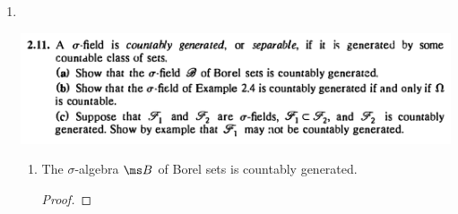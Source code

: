 \begin{enumerate}
\begin{enumerate}[label=(\alph*)]
    \begin{proof}
      Let $\ms A = \{A_1, A_2, \ldots\}$and let $X \in f(\ms A)$.

      Then $X$ can be constructed by starting with the elements $\{A_1, A^c_1, A_2, A^c_2, \ldots\}$ and
      recursively applying finitely many union operations and finitely many intersection operations.

      Suppose that $X$ can be constructed using $m$ union operations.


      We proceed by induction. Since $f(\ms A)$ is an algebra, but not in general a $\sigma$-algebra, it can be
      built by starting with some basis elements and recursively applying a finite number of union and
      intersection operations.




      Induction?

      The finite numbers $m$ and $n_i$ must correspond to the finite unions ($m$) and intersections ($n_i$)
      that are permitted when constructing a finitely additive algebra.


      Or direct? Direct:



      Then it is possible to construct $X$ from the elements of $\ms A$, using complementation, finite unions
      and finite intersections.
    \end{proof}


  \end{enumerate}
\newpage
\item~\\
  \begin{mdframed}
    \includegraphics[width=400pt]{img/analysis--berkeley-202a-hw-fc85.png}
  \end{mdframed}
  \begin{enumerate}[label=(\alph*)]

  \item
    \begin{claim*}
      The $\sigma$-algebra $\ms B$ of Borel sets is countably generated.
    \end{claim*}
    \begin{proof}


\end{proof}
\end{enumerate}
\end{enumerate}
